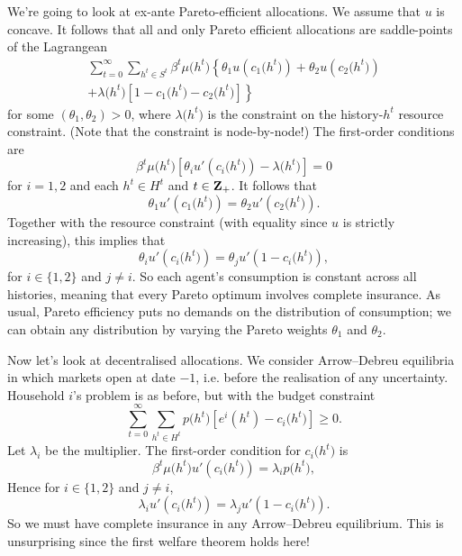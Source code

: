 \documentclass[11pt,letterpaper,reqno,oneside]{article}
\begin{document}
We're going to look at ex-ante Pareto-efficient allocations. We assume that $u$ is concave. It follows that all and only Pareto efficient allocations are saddle-points of the Lagrangean
%
\begin{multline*}
	\sum_{t=0}^\infty \sum_{h^t \in S^t }
	\beta^t \mu\bigl(h^t\bigr) \left\{
	\theta_1 u\left( c_1\bigl(h^t\bigr) \right) 
	+ \theta_2 u\left( c_2\bigl(h^t\bigr) \right) 
	\right.\\\left.
	+ \lambda\bigl(h^t\bigr) 
	\left[ 1 - c_1\bigl(h^t\bigr) - c_2\bigl(h^t\bigr) \right] 
	\right\} 
\end{multline*}
%
for some $(\theta_1,\theta_2) > 0$, where $\lambda\bigl(h^t\bigr)$ is the constraint on the history-$h^t$ resource constraint. (Note that the constraint is node-by-node!) The first-order conditions are
%
\begin{equation*}
	\beta^t \mu\bigl(h^t\bigr) 
	\left[ \theta_i u'\left( c_i\bigl(h^t\bigr) \right) 
	- \lambda\bigl(h^t\bigr) \right] 
	= 0 
\end{equation*}
%
for $i=1,2$ and each $h^t \in H^t$ and $t \in \mathbf{Z}_+$. It follows that
%
\begin{equation*}
	\theta_1 u'\left( c_1\bigl(h^t\bigr) \right)
	= \theta_2 u'\left( c_2\bigl(h^t\bigr) \right) .
\end{equation*}
%
Together with the resource constraint (with equality since $u$ is strictly increasing), this implies that 
%
\begin{equation*}
	\theta_i u'\left( c_i\bigl(h^t\bigr) \right)
	= \theta_j u'\left( 1 - c_i\bigl(h^t\bigr) \right) ,
\end{equation*}
%
for $i \in \{1,2\}$ and $j \neq i$. So each agent's consumption is constant across all histories, meaning that every Pareto optimum involves complete insurance. As usual, Pareto efficiency puts no demands on the distribution of consumption; we can obtain any distribution by varying the Pareto weights $\theta_1$ and $\theta_2$.


Now let's look at decentralised allocations. We consider Arrow--Debreu equilibria in which markets open at date $-1$, i.e. before the realisation of any uncertainty. Household $i$'s problem is as before, but with the budget constraint
%
\begin{equation*}
	\sum_{t=0}^\infty \sum_{h^t \in H^t} p\bigl(h^t\bigr) 
	\left[ e^i(h^t) - c_i\bigl(h^t\bigr) \right] \geq 0 .
\end{equation*}
%
Let $\lambda_i$ be the multiplier. The first-order condition for $c_i\bigl(h^t\bigr)$ is
%
\begin{equation*}
	\beta^t \mu\bigl(h^t\bigr) 
	u'\left( c_i\bigl(h^t\bigr) \right) 
	= \lambda_i p\bigl(h^t\bigr) ,
\end{equation*}
%
Hence for $i \in \{1,2\}$ and $j \neq i$,
%
\begin{equation*}
	\lambda_i u'\left( c_i\bigl(h^t\bigr) \right)
	= \lambda_j u'\left( 1 - c_i\bigl(h^t\bigr) \right) .
\end{equation*}
%
So we must have complete insurance in any Arrow--Debreu equilibrium. This is unsurprising since the first welfare theorem holds here!
\end{document}

